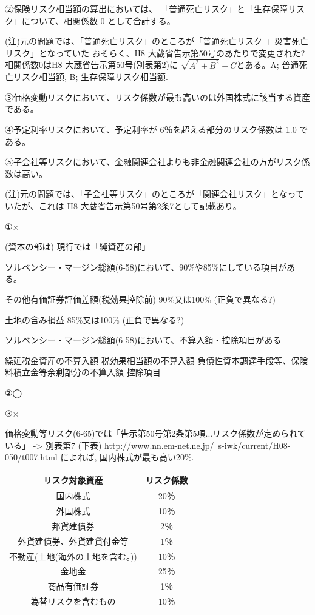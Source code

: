 \documentclass[report,gutter=10mm,fore-edge=10mm,uplatex,dvipdfmx]{jlreq}
\begin{document}
②保険リスク相当額の算出においては、
「普通死亡リスク」と「生存保障リスク」について、相関係数 0 として合計する。

(注)元の問題では、「普通死亡リスク」のところが「普通死亡リスク + 災害死亡リスク」となっていた
おそらく、H8 大蔵省告示第50号のあたりで変更された?
相関係数0はH8 大蔵省告示第50号(別表第2)に $\sqrt{A^2+B^2}+C$とある。A; 普通死亡リスク相当額, B; 生存保障リスク相当額.

③価格変動リスクにおいて、リスク係数が最も高いのは外国株式に該当する資産である。

④予定利率リスクにおいて、予定利率が 6％を超える部分のリスク係数は 1.0 である。

⑤子会社等リスクにおいて、金融関連会社よりも非金融関連会社の方がリスク係数は高い。

(注)元の問題では、「子会社等リスク」のところが「関連会社リスク」となっていたが、これは H8 大蔵省告示第50号第2条7として記載あり。


\answer{}

①×

(資本の部は) 現行では「純資産の部」

ソルベンシー・マージン総額(6-58)において、90\%や85\%にしている項目がある。

その他有価証券評価差額(税効果控除前) 90\%又は100\% (正負で異なる?)

土地の含み損益 85\%又は100\% (正負で異なる?)

ソルベンシー・マージン総額(6-58)において、不算入額・控除項目がある

繰延税金資産の不算入額
税効果相当額の不算入額
負債性資本調達手段等、保険料積立金等余剰部分の不算入額
控除項目

②◯

③×

価格変動等リスク(6-65)では「告示第50号第2条第5項...リスク係数が定められている」
-> 別表第7 (下表) http://www.nn.em-net.ne.jp/~s-iwk/current/H08-050/t007.html
によれば, 国内株式が最も高い20\%.

\begin{tabular}{|c|c|}
 \hline
リスク対象資産&リスク係数 \\ 
 \hline
国内株式	& 20％\\
外国株式	& 10％\\
邦貨建債券	& 2％\\
外貨建債券、外貨建貸付金等	& 1％\\
不動産(土地(海外の土地を含む。))  &	10％\\
金地金	& 25％\\
商品有価証券	& 1％\\
為替リスクを含むもの	& 10％\\
\hline
\end{tabular}
\end{document}
